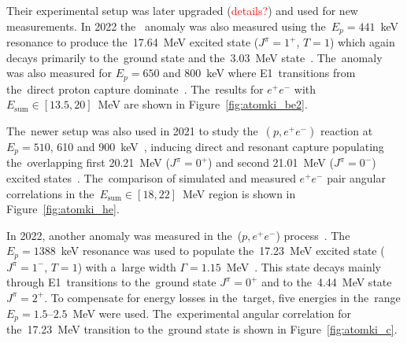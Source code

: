 			Their experimental setup was later upgraded (\textcolor{red}{details?}) and used for new measurements. In 2022 the~ anomaly was also measured using the~$E_p = 441$~keV resonance to produce the~17.64~MeV excited state ($J^\pi = 1^{+}$, $T=1$) which again decays primarily to the~ground state and the~3.03~MeV state~\cite{resonances}. The~anomaly was also measured for $E_p = 650$ and 800~keV where E1~transitions from the~direct proton capture dominate~\cite{atomki_be2}. The~results for $e^+e^-$ with ${E_\text{sum}\in[13.5,20]}$~MeV are shown in Figure~\ref{fig:atomki_be2}.
			
			The~newer setup was also used in 2021 to study the~$(p,e^+ e^-)$ reaction at $E_p = 510$, 610 and 900~keV~\cite{atomki_he2}, inducing direct and resonant capture populating the~overlapping first 20.21~MeV ($J^\pi = 0^+$) and second 21.01~MeV ($J^\pi = 0^-$) excited states~\cite{resonances2}. The~comparison of simulated and measured $e^+e^-$ pair angular correlations in the~${E_\text{sum}\in[18,22]}$~MeV region is shown in Figure~\ref{fig:atomki_he}.
			
			In 2022, another anomaly was measured in the~($p,e^+e^-$) process~\cite{atomki_c}. The~$E_p = 1388$~keV resonance was used to populate the~17.23~MeV excited state ($J^\pi = 1^-$, $T = 1$) with a~large width $\Gamma = 1.15$~MeV~\cite{resonances3}. This state decays mainly through E1~transitions to the~ground state $J^\pi = 0^+$ and to the~4.44~MeV state $J^\pi = 2^+$. To compensate for energy losses in the~target, five energies in the~range $E_p = 1.5\text{--}2.5$~MeV were used. The~experimental angular correlation for the~17.23~MeV transition to the~ground state is shown in Figure~\ref{fig:atomki_c}.
			

